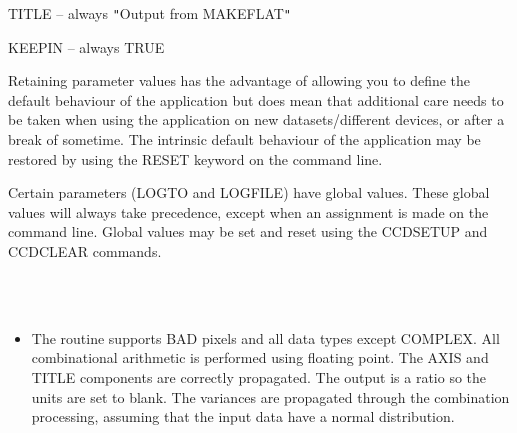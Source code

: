 \documentclass[twoside,11pt]{article}
\newcommand{\htmlref}[2]{#1}
\renewcommand{\_}{\texttt{\symbol{95}}}
\newcommand{\qt}[1]{{\tt "}#1{\tt "}}
\newcommand{\xroutine}[1]{\htmlref{{\sc #1}}{#1}}
\newcommand{\sstimplementationstatus}[1]{
   \item[{Implementation Status:}] \mbox{} \\[1.3ex] #1}
\newcommand{\sstitemlist}[1]{
  \mbox{} \\
  \vspace{-3.5ex}
  \begin{itemize}
     #1
  \end{itemize}
}
\newcommand{\sstitem}{\item}
\newcommand{\sstimplementationstatus}[1]{
      \item[Implementation Status:] #1
   }
\newcommand{\sstitemlist}[1]{
      \begin{itemize}
         #1
      \end{itemize}
      \\
   }
\newcommand{\sstitem}{\item}
\begin{document}
{{{         \sstitem
            TITLE   -- always \qt{Output from MAKEFLAT}

         \sstitem
            KEEPIN  -- always TRUE

      }
      Retaining parameter values has the advantage of allowing you to
      define the default behaviour of the application but does mean
      that additional care needs to be taken when using the application
      on new datasets/different devices, or after a break of sometime.
      The intrinsic default behaviour of the application may be
      restored by using the RESET keyword on the command line.

      Certain parameters (LOGTO and LOGFILE) have global values. These
      global values will always take precedence, except when an
      assignment is made on the command line.  Global values may be set
      and reset using the \xroutine{CCDSETUP} and \xroutine{CCDCLEAR} commands.
   }
   \sstimplementationstatus{
      \sstitemlist{

         \sstitem
         The routine supports BAD pixels and all data types except
           COMPLEX.  All combinational arithmetic is performed using
           floating point.  The AXIS and TITLE components are
           correctly propagated. The output is a ratio so the units are set
           to blank. The variances are propagated through the combination
           processing, assuming that the input data have a normal
           distribution.
      }
   }
}
\end{document}
